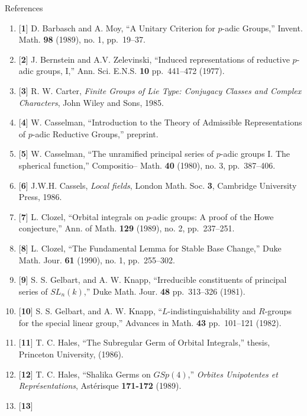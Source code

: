 \documentclass{amsart}
\begin{document}
\newpage
\noindent
\centerline{ {\smc References} }
\bigskip
\baselineskip=12pt

%
\begin{enumerate}[label=]
\item{[{\bf 1}]}
  D. Barbasch and A. Moy,
  ``A Unitary Criterion for $p$-adic Groups,'' Invent. Math. {\bf 98}
  (1989), no. 1, pp.~19--37.
%
\item{[{\bf 2}]}
  J. Bernstein and A.V. Zelevinski,
  ``Induced representations of reductive $p$-adic groups, I,''
  Ann. Sci. E.N.S. {\bf 10}
  pp.~441--472 (1977).
%
\item{[{\bf 3}]}
  R. W. Carter,
  {\sl Finite Groups of Lie Type: Conjugacy Classes and Complex
     Characters},
  John Wiley and Sons, 1985.
%
\item{[{\bf 4}]}
  W. Casselman,
  ``Introduction to the Theory of Admissible Representations
     of $p$-adic Reductive Groups,'' preprint.
%
\item{[{\bf 5}]}
  W. Casselman,
  ``The unramified principal series of $p$-adic groups I. 
    The spherical function,'' Compositio-- Math. {\bf 40}
    (1980), no. 3, pp.~387--406.
%
\item{[{\bf 6}]}
  J.W.H. Cassels,
  {\sl Local fields}, London Math. Soc. {\bf 3}, Cambridge
  University Press, 1986.
%
\item{[{\bf 7}]}
  L. Clozel,
  ``Orbital integrals on $p$-adic groups:  A proof of 
     the Howe conjecture,''  Ann. of Math. {\bf 129} (1989),
     no. 2, pp.~237--251.
%
\item{[{\bf 8}]}
  L. Clozel,
  ``The Fundamental Lemma for Stable Base Change,''
  Duke Math. Jour. {\bf 61} (1990), no. 1, pp.~255--302.
%
\item{[{\bf 9}]}
  S. S. Gelbart, and A. W. Knapp,
  ``Irreducible constituents of principal series of $SL_n(k)$,''
  Duke Math. Jour. {\bf 48} pp.~313--326 (1981).
%
\item{[{\bf 10}]}
  S. S. Gelbart, and A. W. Knapp,
  ``$L$-indistinguishability and $R$-groups for the
     special linear group,''
  Advances in Math. {\bf 43} pp.~101--121 (1982).
%
\item{[{\bf 11}]}
  T. C. Hales,
  ``The Subregular Germ of Orbital Integrals,''
  thesis, Princeton University, (1986).
%
\item{[{\bf 12}]}
  T. C. Hales,\enspace%
  ``Shalika Germs on $GSp(4)$,''
  {\sl Orbites Uni\-po\-tentes et Repr\'e\-sen\-ta\-tions}, 
  Ast\'erisque {\bf 171-172} (1989).
%
\item{[{\bf 13}]}

\end{enumerate}
\end{document}
